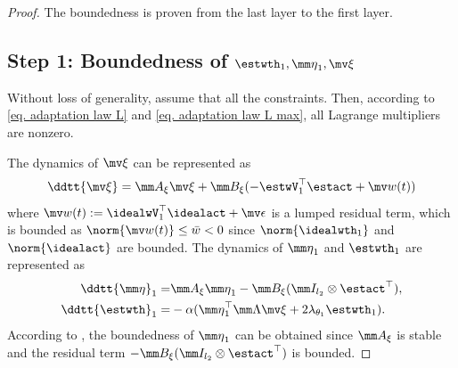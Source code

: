 \documentclass[letterpaper, 10 pt, conference]{ieeeconf}  %
\begin{document}
\begin{proof}
The boundedness is proven from the last layer to the first layer.

\subsection*{Step 1: Boundedness of ${\estwth}_1,{\mm \eta}_1,\mv \xi$}

\color{black}
Without loss of generality, assume that all the constraints. Then, according to \eqref{eq. adaptation law L} and \eqref{eq. adaptation law L max}, all Lagrange multipliers are nonzero.
\color{black}

The dynamics of $\mv \xi$ can be represented as
\begin{equation}    
    \ddtt {\mv\xi} = \mm A_\xi\mv \xi +\mm B_\xi
    (
        -\estwV_1^\top \estact+\mv w(t)
    )
\end{equation}
where $\mv w(t):= {\idealwV}_1^{\top}\idealact+\mv \epsilon$ is a lumped residual term, which is bounded as $\norm{\mv  w(t)}\le \bar w< 0$ since $\norm{\idealwth_1}$ and $\norm{\idealact}$ are bounded.
The dynamics of ${\mm \eta}_1$ and ${\estwth}_1$ are represented as
\begin{equation}
    \begin{aligned}
        \ddtt{\mm \eta}_1 =
        & 
        \mm A_\xi {\mm \eta}_1 -\mm B_\xi (\mm I_{l_{2}}\otimes \estact^\top )
        ,
        \\
        \ddtt{{\estwth}}_1 =
        & -\alpha 
        (
            {\mm \eta}_1^\top 
            \mm \Lambda
            \mv\xi
            +
            2\lambda_{\theta_1} {\estwth}_1
        )
        .
    \end{aligned} 
\end{equation}
According to \cite[Chap.~4 T.~1.9]{Desoer:2009aa}, the boundedness of ${\mm \eta}_1$ can be obtained since $\mm A_\xi$ is stable and the residual term $-\mm B_\xi (\mm I_{l_{2}}\otimes \estact^\top )$ is bounded.


\end{proof}
\end{document}
